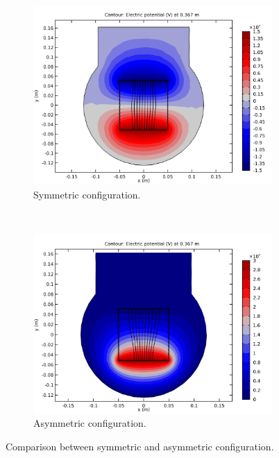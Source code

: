 \begin{figure}[!ht]
	\begin{subfigure}{0.5\textwidth}
		\includegraphics[width=\textwidth]{03_Prototype/figures/fig021_image_asym_sym_b.png}
		\caption{Symmetric configuration.}
		\label{chap3:asym_sym_b}
  \end{subfigure}
  ~
  \begin{subfigure}{0.5\textwidth}
		\includegraphics[width=\textwidth]{03_Prototype/figures/fig021_image_asym_sym_a.png}
		\caption{Asymmetric configuration.}
		\label{chap3:asym_sym_a}
  \end{subfigure}
	\caption[Comparison between symmetric and asymmetric configuration]{Comparison between symmetric and asymmetric configuration.}
	\label{chap3:asym_sym}
\end{figure}
